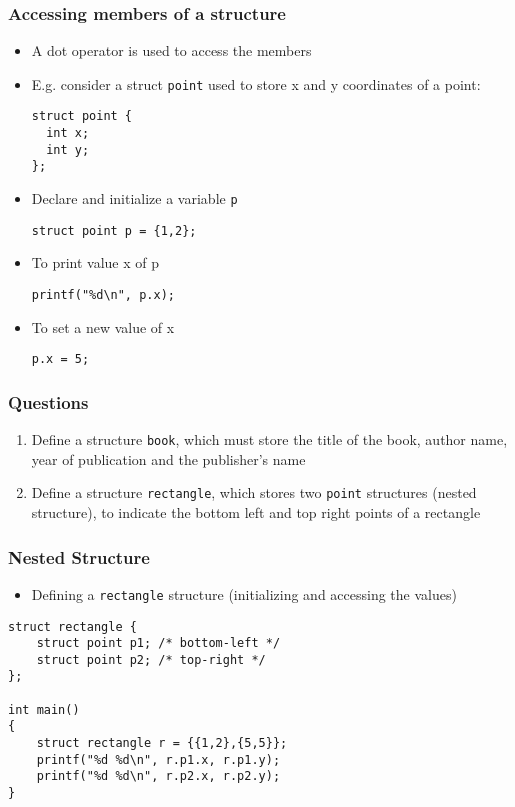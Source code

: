 \documentclass[11pt]{beamer}
\begin{document}
\begin{frame}[fragile]\frametitle{Accessing members of a structure}
\label{sec-1-3}

\begin{itemize}
\item A dot operator is used to access the members
\item E.g. consider a struct \verb~point~ used to store x and y coordinates of a point:

\begin{verbatim}
struct point {
  int x;
  int y;
};
\end{verbatim}
\item Declare and initialize a variable \verb~p~ 

\begin{verbatim}
struct point p = {1,2};
\end{verbatim}
\item To print value x of p

\begin{verbatim}
printf("%d\n", p.x);
\end{verbatim}
\item To set a new value of x

\begin{verbatim}
p.x = 5;
\end{verbatim}
\end{itemize}
\end{frame}
\begin{frame}[fragile]\frametitle{Questions}
\label{sec-1-4}

\begin{enumerate}
\item Define a structure \verb~book~, which must store the title of the book, author name, year of publication and the publisher's name
\item Define a structure \verb~rectangle~, which stores two \verb~point~ structures (nested structure), to indicate the bottom left and top right points of a rectangle
\end{enumerate}
\end{frame}
\begin{frame}[fragile]\frametitle{Nested Structure}
\label{sec-1-5}

\begin{itemize}
\item Defining a \verb~rectangle~ structure (initializing and accessing the values)
\end{itemize}


\begin{verbatim}
struct rectangle {
    struct point p1; /* bottom-left */
    struct point p2; /* top-right */
};

int main()
{
    struct rectangle r = {{1,2},{5,5}};
    printf("%d %d\n", r.p1.x, r.p1.y);
    printf("%d %d\n", r.p2.x, r.p2.y);
}
\end{verbatim}
\end{frame}
\end{document}
